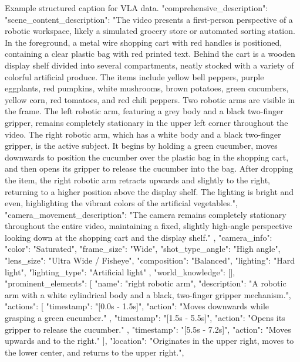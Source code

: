 \begin{captionexample}{Example structured caption for VLA data.}
{
  "comprehensive_description": {
    "scene_content_description": "The video presents a first-person perspective of a robotic workspace, likely a simulated grocery store or automated sorting station. In the foreground, a metal wire shopping cart with red handles is positioned, containing a clear plastic bag with red printed text. Behind the cart is a wooden display shelf divided into several compartments, neatly stocked with a variety of colorful artificial produce. The items include yellow bell peppers, purple eggplants, red pumpkins, white mushrooms, brown potatoes, green cucumbers, yellow corn, red tomatoes, and red chili peppers. Two robotic arms are visible in the frame. The left robotic arm, featuring a grey body and a black two-finger gripper, remains completely stationary in the upper left corner throughout the video. The right robotic arm, which has a white body and a black two-finger gripper, is the active subject. It begins by holding a green cucumber, moves downwards to position the cucumber over the plastic bag in the shopping cart, and then opens its gripper to release the cucumber into the bag. After dropping the item, the right robotic arm retracts upwards and slightly to the right, returning to a higher position above the display shelf. The lighting is bright and even, highlighting the vibrant colors of the artificial vegetables.",
    "camera_movement_description": "The camera remains completely stationary throughout the entire video, maintaining a fixed, slightly high-angle perspective looking down at the shopping cart and the display shelf."
  },
  "camera_info": {
    "color": "Saturated",
    "frame_size": "Wide",
    "shot_type_angle": "High angle",
    "lens_size": "Ultra Wide / Fisheye",
    "composition": "Balanced",
    "lighting": "Hard light",
    "lighting_type": "Artificial light"
  },
  "world_knowledge": [],
  "prominent_elements": [
    {
      "name": "right robotic arm",
      "description": "A robotic arm with a white cylindrical body and a black, two-finger gripper mechanism.",
      "actions": [
        {
          "timestamp": "[0.0s - 1.5s]",
          "action": "Moves downwards while grasping a green cucumber."
        },
        {
          "timestamp": "[1.5s - 5.5s]",
          "action": "Opens its gripper to release the cucumber."
        },
        {
          "timestamp": "[5.5s - 7.2s]",
          "action": "Moves upwards and to the right."
        }
      ],
      "location": "Originates in the upper right, moves to the lower center, and returns to the upper right.",
}}
\end{captionexample}
